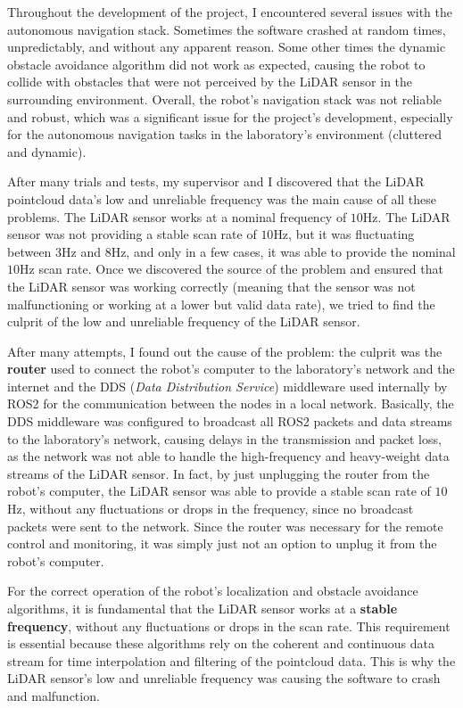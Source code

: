 Throughout the development of the project, I encountered several issues with the autonomous navigation stack.
Sometimes the software crashed at random times, unpredictably, and without any apparent reason.
Some other times the dynamic obstacle avoidance algorithm did not work as expected, causing the robot to collide
with obstacles that were not perceived by the LiDAR sensor in the surrounding environment.
Overall, the robot's navigation stack was not reliable and robust, which was a significant issue for the project's development,
especially for the autonomous navigation tasks in the laboratory's environment (cluttered and dynamic).

After many trials and tests, my supervisor and I discovered that the LiDAR pointcloud data's low and unreliable frequency
was the main cause of all these problems. The LiDAR sensor works at a nominal frequency of $10$Hz. 
The LiDAR sensor was not providing a stable scan rate of $10$Hz, but it was fluctuating between $3$Hz and $8$Hz, 
and only in a few cases, it was able to provide the nominal $10$Hz scan rate.
Once we discovered the source of the problem and ensured that the LiDAR sensor was working correctly
(meaning that the sensor was not malfunctioning or working at a lower but valid data rate), 
we tried to find the culprit of the low and unreliable frequency of the LiDAR sensor.

After many attempts, I found out the cause of the problem: the culprit was the \textbf{router}
used to connect the robot's computer
to the laboratory's network and the internet and the DDS (\textit{Data Distribution Service}) middleware used 
internally by ROS2 for the communication between the nodes in a local network. Basically, the DDS middleware
was configured to broadcast all ROS2 packets and data streams to the laboratory's network, causing delays in the transmission
and packet loss, as the network was not able to handle the high-frequency and heavy-weight data streams of the LiDAR sensor.
In fact, by just unplugging the router from the robot's computer, the LiDAR sensor was able to provide a stable scan rate
of $10$Hz, without any fluctuations or drops in the frequency, since no broadcast packets were sent to the network.
Since the router was necessary for the remote control and monitoring, it was simply just not an option
to unplug it from the robot's computer.

For the correct operation of the robot's localization and obstacle 
avoidance algorithms, it is fundamental that the LiDAR sensor works at a \textbf{stable frequency}, 
without any fluctuations or drops in the scan rate. This requirement is essential because these algorithms rely on the
coherent and continuous data stream for time interpolation and filtering of the pointcloud data.
This is why the LiDAR sensor's low and unreliable frequency was causing the software to crash and malfunction.

